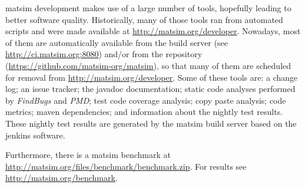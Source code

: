 %


\gls{matsim} development makes use of a 
large number of tools, hopefully leading to better software quality.  Historically, many of those tools ran from automated scripts and were made available at \url{http://matsim.org/developer}.  Nowadays, most of them are automatically available from the build server (see \url{http://ci.matsim.org:8080}) and/or from the repository (\url{https://github.com/matsim-org/matsim}), so that many of them are scheduled for removal from \url{http://matsim.org/developer}.  Some of these tools are:
%
a change log; an issue tracker; the \gls{javadoc} documentation; static code analyses performed by \emph{FindBugs} and \emph{PMD}; test code coverage analysis; copy paste analysis; code metrics; \gls{maven} dependencies; 
and information about the nightly test results. These nightly test results are generated by the \gls{matsim} build server based on the \gls{jenkins} software. 

Furthermore, there is a \gls{matsim} benchmark at \url{http://matsim.org/files/benchmark/benchmark.zip}. For results see \url{http://matsim.org/benchmark}.

